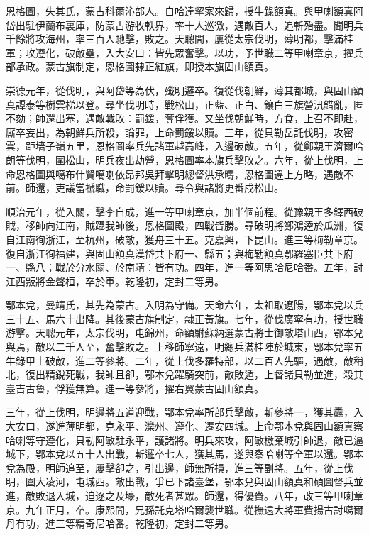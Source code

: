 \begin{pinyinscope}
恩格圖，失其氏，蒙古科爾沁部人。自哈達挈家來歸，授牛錄額真。與甲喇額真阿岱出駐伊蘭布裏庫，防蒙古游牧軼界，率十人巡徼，遇敵百人，追斬殆盡。聞明兵千餘將攻海州，率三百人馳擊，敗之。天聰間，屢從太宗伐明，薄明都，擊滿桂軍；攻遵化，破敵壘，入大安口：皆先眾奮擊。以功，予世職二等甲喇章京，擢兵部承政。蒙古旗制定，恩格圖隸正紅旗，即授本旗固山額真。

崇德元年，從伐明，與阿岱等為伏，殲明邏卒。復從伐朝鮮，薄其都城，與固山額真譚泰等樹雲梯以登。尋坐伐明時，戰松山，正藍、正白、鑲白三旗營汛錯亂，匿不劾；師還出塞，遇敵戰敗：罰鍰，奪俘獲。又坐伐朝鮮時，方食，上召不即赴，廝卒妄出，為朝鮮兵所殺，論罪，上命罰鍰以贖。三年，從貝勒岳託伐明，攻密雲，距墻子嶺五里，恩格圖率兵先諸軍越高峰，入邊破敵。五年，從鄭親王濟爾哈朗等伐明，圍松山，明兵夜出劫營，恩格圖率本旗兵擊敗之。六年，從上伐明，上命恩格圖與噶布什賢噶喇依昂邦吳拜擊明總督洪承疇，恩格圖違上方略，遇敵不前。師還，吏議當褫職，命罰鍰以贖。尋令與諸將更番戍松山。

順治元年，從入關，擊李自成，進一等甲喇章京，加半個前程。從豫親王多鐸西破賊，移師向江南，賊躡我師後，恩格圖殿，四戰皆勝。尋破明將鄭鴻逵於瓜洲，復自江南徇浙江，至杭州，破敵，獲舟三十五。克嘉興，下昆山。進三等梅勒章京。復自浙江徇福建，與固山額真漢岱共下府一、縣五；與梅勒額真鄂羅塞臣共下府一、縣八；戰於分水關、於南靖：皆有功。四年，進一等阿思哈尼哈番。五年，討江西叛將金聲桓，卒於軍。乾隆初，定封二等男。

鄂本兌，曼靖氏，其先為蒙古。入明為守備。天命六年，太祖取遼陽，鄂本兌以兵三十五、馬六十出降。其後蒙古旗制定，隸正黃旗。七年，從伐廣寧有功，授世職游擊。天聰元年，太宗伐明，屯錦州，命額駙蘇納選蒙古將士御敵塔山西，鄂本兌與焉，敵以二千人至，奮擊敗之。上移師寧遠，明總兵滿桂陣於城東，鄂本兌率五牛錄甲士破敵，進二等參將。二年，從上伐多羅特部，以二百人先驅，遇敵，敵稍北，復出精銳死戰，我師且卻，鄂本兌躍騎突前，敵敗遁，上督諸貝勒並進，殺其臺吉古魯，俘獲無算。進一等參將，擢右翼蒙古固山額真。

三年，從上伐明，明邊將五道迎戰，鄂本兌率所部兵擊敵，斬參將一，獲其纛，入大安口，遂進薄明都，克永平、灤州、遵化、遷安四城。上命鄂本兌與固山額真察哈喇等守遵化，貝勒阿敏駐永平，護諸將。明兵來攻，阿敏檄棄城引師退，敵已逼城下，鄂本兌以五十人出戰，斬邏卒七人，獲其馬，遂與察哈喇等全軍以還。鄂本兌為殿，明師追至，屢擊卻之，引出邊，師無所損，進三等副將。五年，從上伐明，圍大凌河，屯城西。敵出戰，爭已下諸臺堡，鄂本兌與固山額真和碩圖督兵並進，敵敗退入城，迫逐之及壕，敵死者甚眾。師還，得優賚。八年，改三等甲喇章京。九年正月，卒。康熙間，兄孫託克塔哈爾襲世職。從撫遠大將軍費揚古討噶爾丹有功，進三等精奇尼哈番。乾隆初，定封二等男。


\end{pinyinscope}
